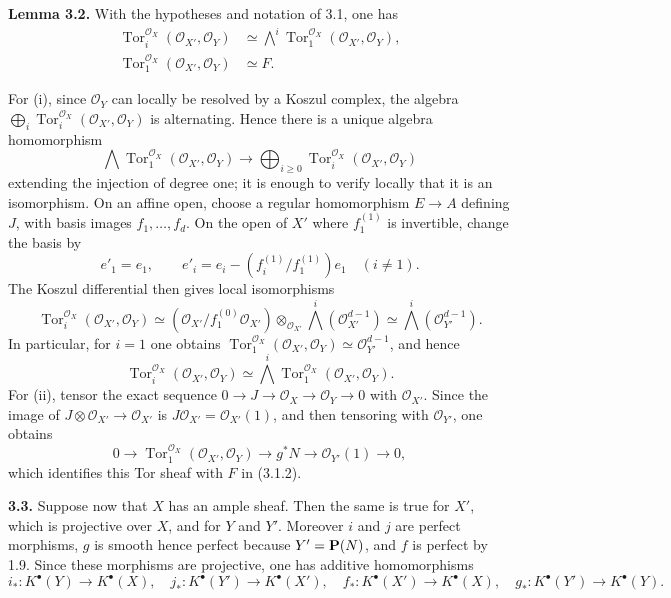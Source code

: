 \documentclass[11pt]{article}
\newcommand{\Tor}{\operatorname{Tor}}
\providecommand{\Tor}{\operatorname{Tor}}
\providecommand{\cO}{\mathcal O}
\begin{document}
\textbf{Lemma 3.2.} With the hypotheses and notation of 3.1, one has
\begin{align}
\Tor_i^{\cO_X}(\cO_{X'},\cO_Y)&\simeq
\bigwedge^i\Tor_1^{\cO_X}(\cO_{X'},\cO_Y),\tag{3.2.i}\\
\Tor_1^{\cO_X}(\cO_{X'},\cO_Y)&\simeq F.\tag{3.2.ii}
\end{align}

For (i), since \(\cO_Y\) can locally be resolved by a Koszul complex, the algebra \(\bigoplus_i\Tor_i^{\cO_X}(\cO_{X'},\cO_Y)\) is alternating. Hence there is a unique algebra homomorphism
\begin{equation}\tag{3.2.1}
\bigwedge \Tor_1^{\cO_X}(\cO_{X'},\cO_Y)
\longrightarrow
\bigoplus_{i\ge0}\Tor_i^{\cO_X}(\cO_{X'},\cO_Y)
\end{equation}
extending the injection of degree one; it is enough to verify locally that it is an isomorphism. On an affine open, choose a regular homomorphism \(E\to A\) defining \(J\), with basis images \(f_1,\ldots,f_d\). On the open of \(X'\) where \(f_1^{(1)}\) is invertible, change the basis by
\[
e'_1=e_1,
\qquad
e'_i=e_i-(f_i^{(1)}/f_1^{(1)})e_1\quad(i\ne1).
\]
The Koszul differential then gives local isomorphisms
\begin{equation}\tag{3.2.2}
\Tor_i^{\cO_X}(\cO_{X'},\cO_Y)
\simeq
(\cO_{X'}/f_1^{(0)}\cO_{X'})\otimes_{\cO_{X'}}
\bigwedge^i(\cO_{X'}^{d-1})
\simeq
\bigwedge^i(\cO_{Y'}^{d-1}).
\end{equation}
In particular, for \(i=1\) one obtains \(\Tor_1^{\cO_X}(\cO_{X'},\cO_Y)\simeq \cO_{Y'}^{d-1}\), and hence
\begin{equation}\tag{3.2.3}
\Tor_i^{\cO_X}(\cO_{X'},\cO_Y)
\simeq
\bigwedge^i\Tor_1^{\cO_X}(\cO_{X'},\cO_Y).
\end{equation}
For (ii), tensor the exact sequence \(0\to J\to\cO_X\to\cO_Y\to0\) with \(\cO_{X'}\). Since the image of \(J\otimes\cO_{X'}\to\cO_{X'}\) is \(J\cO_{X'}=\cO_{X'}(1)\), and then tensoring with \(\cO_{Y'}\), one obtains
\begin{equation}\tag{3.2.4}
0\to \Tor_1^{\cO_X}(\cO_{X'},\cO_Y)\to g^*N\to\cO_{Y'}(1)\to0,
\end{equation}
which identifies this Tor sheaf with \(F\) in (3.1.2).

\textbf{3.3.} Suppose now that \(X\) has an ample sheaf. Then the same is true for \(X'\), which is projective over \(X\), and for \(Y\) and \(Y'\). Moreover \(i\) and \(j\) are perfect morphisms, \(g\) is smooth hence perfect because \(Y'=\mathbf P(N)\), and \(f\) is perfect by 1.9. Since these morphisms are projective, one has additive homomorphisms
\[
i_*:K^\bullet(Y)\to K^\bullet(X),\quad
j_*:K^\bullet(Y')\to K^\bullet(X'),\quad
f_*:K^\bullet(X')\to K^\bullet(X),\quad
g_*:K^\bullet(Y')\to K^\bullet(Y).
\]
\end{document}

